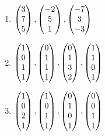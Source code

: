 \begin{enumerate}
\begin{multicols}{2}
\begin{enumerate}
				    \item $\mvect{3\\7\\5}, \mvect{-2\\5\\1}, \mvect{-7\\3\\-3}$
				    \item $\mvect{1\\0\\1\\1}, \mvect{0\\1\\1\\1}, \mvect{0\\1\\3\\2},
					\mvect{1\\1\\0\\1}$
				    \item $\mvect{1\\0\\2\\1}, \mvect{1\\0\\1\\1},
					\mvect{0\\1\\0\\1}, \mvect{0\\0\\1\\1}$
				\end{enumerate}
			\end{multicols}
		\end{enumerate}